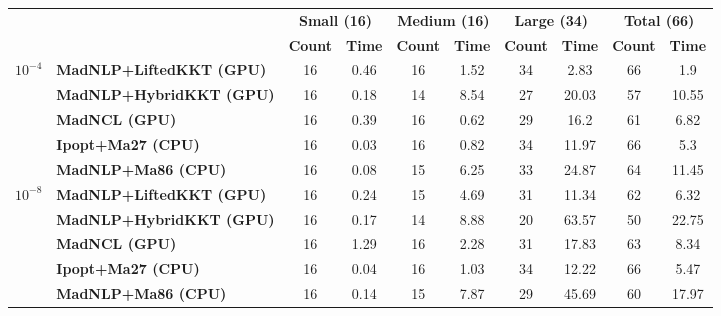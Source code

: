 \begin{center}
\renewcommand{\arraystretch}{0.9}
\begin{tabular}{|l|l|cc|cc|cc|cc|}
\hline
 & & \multicolumn{2}{c|}{\textbf{Small (16)}} & \multicolumn{2}{c|}{\textbf{Medium (16)}} & \multicolumn{2}{c|}{\textbf{Large (34)}} & \multicolumn{2}{c|}{\textbf{Total (66)}} \\
 & & \textbf{Count} & \textbf{Time} & \textbf{Count} & \textbf{Time} & \textbf{Count} & \textbf{Time} & \textbf{Count} & \textbf{Time} \\
\hline
\multirow{5}{*}{\Large\textbf{$10^{-4}$}} & \textbf{MadNLP+LiftedKKT (GPU)} & \cellcolor{blue!15}16 & 0.46 & \cellcolor{blue!15}16 & 1.52 & \cellcolor{blue!15}34 & \cellcolor{blue!15}2.83 & \cellcolor{blue!15}66 & \cellcolor{blue!15}1.9 \\
 & \textbf{MadNLP+HybridKKT (GPU)} & \cellcolor{blue!15}16 & 0.18 & 14 & 8.54 & 27 & 20.03 & 57 & 10.55 \\
 & \textbf{MadNCL (GPU)} & \cellcolor{blue!15}16 & 0.39 & \cellcolor{blue!15}16 & \cellcolor{blue!15}0.62 & 29 & 16.2 & 61 & 6.82 \\
 & \textbf{Ipopt+Ma27 (CPU)} & \cellcolor{blue!15}16 & \cellcolor{blue!15}0.03 & \cellcolor{blue!15}16 & 0.82 & \cellcolor{blue!15}34 & 11.97 & \cellcolor{blue!15}66 & 5.3 \\
 & \textbf{MadNLP+Ma86 (CPU)} & \cellcolor{blue!15}16 & 0.08 & 15 & 6.25 & 33 & 24.87 & 64 & 11.45 \\
\hline
\multirow{5}{*}{\Large\textbf{$10^{-8}$}} & \textbf{MadNLP+LiftedKKT (GPU)} & \cellcolor{blue!15}16 & 0.24 & 15 & 4.69 & 31 & \cellcolor{blue!15}11.34 & 62 & 6.32 \\
 & \textbf{MadNLP+HybridKKT (GPU)} & \cellcolor{blue!15}16 & 0.17 & 14 & 8.88 & 20 & 63.57 & 50 & 22.75 \\
 & \textbf{MadNCL (GPU)} & \cellcolor{blue!15}16 & 1.29 & \cellcolor{blue!15}16 & 2.28 & 31 & 17.83 & 63 & 8.34 \\
 & \textbf{Ipopt+Ma27 (CPU)} & \cellcolor{blue!15}16 & \cellcolor{blue!15}0.04 & \cellcolor{blue!15}16 & \cellcolor{blue!15}1.03 & \cellcolor{blue!15}34 & 12.22 & \cellcolor{blue!15}66 & \cellcolor{blue!15}5.47 \\
 & \textbf{MadNLP+Ma86 (CPU)} & \cellcolor{blue!15}16 & 0.14 & 15 & 7.87 & 29 & 45.69 & 60 & 17.97 \\
\hline
\end{tabular}
\end{center}
